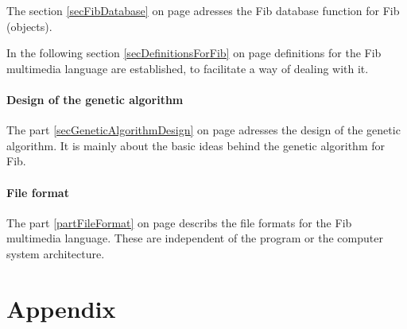 \documentclass[11pt,a4paper]{article}
\begin{document}
The section \ref{secFibDatabase} on page \pageref{secFibDatabase} adresses the Fib database function for Fib (objects).

In the following section \ref{secDefinitionsForFib} on page \pageref{secDefinitionsForFib} definitions for the Fib multimedia language are established, to facilitate a way of dealing with it.


\subsection{Design of the genetic algorithm}

The part \ref{secGeneticAlgorithmDesign} on page \pageref{secGeneticAlgorithmDesign} adresses the design of the genetic algorithm. It is mainly about the basic ideas behind the genetic algorithm for Fib.


\subsection{File format}

The part \ref{partFileFormat} on page \pageref{partFileFormat} describs the file formats for the Fib multimedia language. These are independent of the program or the computer system architecture.








\newpage
\part{Appendix}

\end{document}
